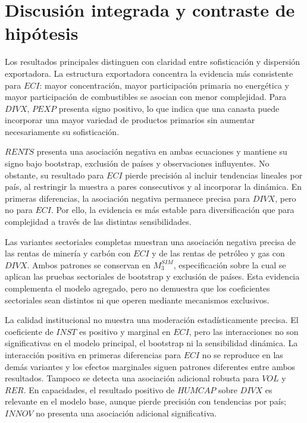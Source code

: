 \documentclass[../../TFM.tex]{subfiles}
\begin{document}
\section{Discusión integrada y contraste de hipótesis}
\label{sec:discusion-resultados}

Los resultados principales distinguen con claridad entre sofisticación y
dispersión exportadora. La estructura exportadora concentra la evidencia más
consistente para $ECI$: mayor concentración, mayor participación primaria no
energética y mayor participación de combustibles se asocian con menor
complejidad. Para $DIVX$, $PEXP$ presenta signo positivo, lo que indica que una
canasta puede incorporar una mayor variedad de productos primarios sin aumentar
necesariamente su sofisticación.

$RENTS$ presenta una asociación negativa en ambas ecuaciones y mantiene su
signo bajo bootstrap, exclusión de países y observaciones influyentes. No
obstante, su resultado para $ECI$ pierde precisión al incluir tendencias
lineales por país, al restringir la muestra a pares consecutivos y al incorporar
la dinámica. En primeras diferencias, la asociación negativa permanece precisa
para $DIVX$, pero no para $ECI$. Por ello, la evidencia es más estable para
diversificación que para complejidad a través de las distintas sensibilidades.

Las variantes sectoriales completas muestran una asociación negativa precisa de
las rentas de minería y carbón con $ECI$ y de las rentas de petróleo y gas con
$DIVX$. Ambos patrones se conservan en $M_{3}^{SIM}$, especificación sobre la
cual se aplican las pruebas sectoriales de bootstrap y exclusión de países. Esta
evidencia complementa el modelo agregado, pero no demuestra que los coeficientes
sectoriales sean distintos ni que operen mediante mecanismos exclusivos.

La calidad institucional no muestra una moderación estadísticamente precisa.
El coeficiente de $INST$ es positivo y marginal en $ECI$, pero las interacciones
no son significativas en el modelo principal, el bootstrap ni la sensibilidad
dinámica. La interacción positiva en primeras diferencias para $ECI$ no se
reproduce en las demás variantes y los efectos marginales siguen patrones
diferentes entre ambos resultados. Tampoco se detecta una asociación adicional
robusta para $VOL$ y $RER$. En capacidades, el resultado positivo de $HUMCAP$
sobre $DIVX$ es relevante en el modelo base, aunque pierde precisión con
tendencias por país; $INNOV$ no presenta una asociación adicional significativa.
\end{document}
